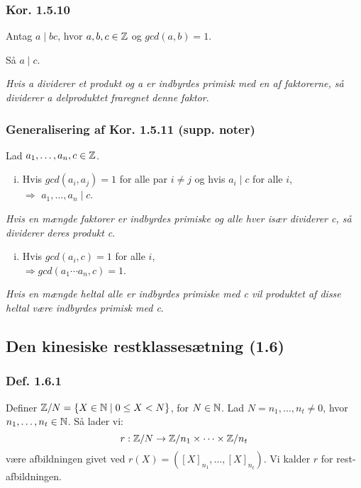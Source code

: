 \subsubsection{Kor. 1.5.10}
Antag $a \mid bc$, hvor $a, b, c \in \mathbb{Z}$ og $gcd(a,b) = 1$.

Så $a \mid c$.

\textit{Hvis a dividerer et produkt og a er indbyrdes primisk med en af
faktorerne, så dividerer a delproduktet fraregnet denne faktor}.

\subsubsection{Generalisering af Kor. 1.5.11 (supp. noter)}
Lad $a_1, \ldots , a_n, c \in \mathbb{Z}$.
\begin{enumerate}[(i)]
  \item Hvis $gcd(a_i, a_j) = 1$ for alle par $i \neq j$ og hvis $a_i \mid c$
  for alle $i$,
  \\ $\Rightarrow$ $a_1, \ldots , a_n \mid c$.
\end{enumerate}
\textit{Hvis en mængde faktorer er indbyrdes primiske og alle hver især
dividerer c, så dividerer deres produkt c}.

\begin{enumerate}[(ii)]
  \item Hvis $gcd(a_i, c) = 1$ for alle $i$,
  \\ $\Rightarrow gcd(a_1 \cdots a_n, c) = 1$.
\end{enumerate}
\textit{Hvis en mængde heltal alle er indbyrdes primiske med c vil produktet af
disse heltal være indbyrdes primisk med c}.


\subsection{Den kinesiske restklassesætning (1.6)}
\subsubsection{Def. 1.6.1}
Definer $\mathbb{Z} / N = \{ X \in \mathbb{N} \mid 0 \leq X < N \}$, for $N \in \mathbb{N}$. Lad $N =
n_1, \ldots, n_t \neq 0$, hvor $n_1, \ldots, n_t \in \mathbb{N}$. Så lader vi:
\begin{equation*}
  r: \mathbb{Z}/N \rightarrow \mathbb{Z}/n_1 \times \cdots \times \mathbb{Z}/n_t
\end{equation*}
være afbildningen givet ved $r(X) = ([X]_{n_1}, \ldots, [X]_{n_t})$. Vi kalder
$r$ for rest-afbildningen.

